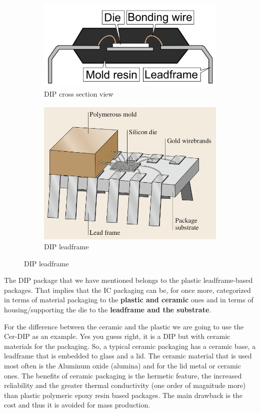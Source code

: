 \documentclass[final]{cubedoc}
\begin{document}
	\begin{figure}[h!]
		\centering
		\begin{subfigure}{.5\textwidth}
			\centering
			\includegraphics[width=0.7\linewidth]{docs/pdip.png}
			\caption{DIP cross section view}
			\label{fig:sub1}
		\end{subfigure}%
		\begin{subfigure}{.5\textwidth}
			\centering
			\includegraphics[keepaspectratio, width=0.7\linewidth, height=.4\textheight]{docs/dip_leadframe.png}
			\caption{DIP leadframe}
			\label{fig:sub2}
		\end{subfigure}
		\label{fig:test}
	\end{figure}
	
	The DIP package that we have mentioned belongs to the plastic leadframe-based packages. That implies that the IC packaging can be, for once more, categorized in terms of material packaging to the \textbf{plastic and ceramic} ones and in terms of housing/supporting the die to the \textbf{leadframe and the substrate}.
	
	For the difference between the ceramic and the plastic we are going to use the Cer-DIP as an example. Yes you guess right, it is a DIP but with ceramic materials for the packaging. So, a typical ceramic packaging has a ceramic base, a leadframe that is embedded to glass and a lid. The ceramic material that is used most often is the Aluminum oxide (alumina) and for the lid metal or ceramic ones. The benefits of ceramic packaging is the hermetic feature, the increased reliability and the greater thermal conductivity (one order of magnitude more) than plastic polymeric epoxy resin based packages. The main drawback is the cost and thus it is avoided for mass production. 
	
\end{document}
